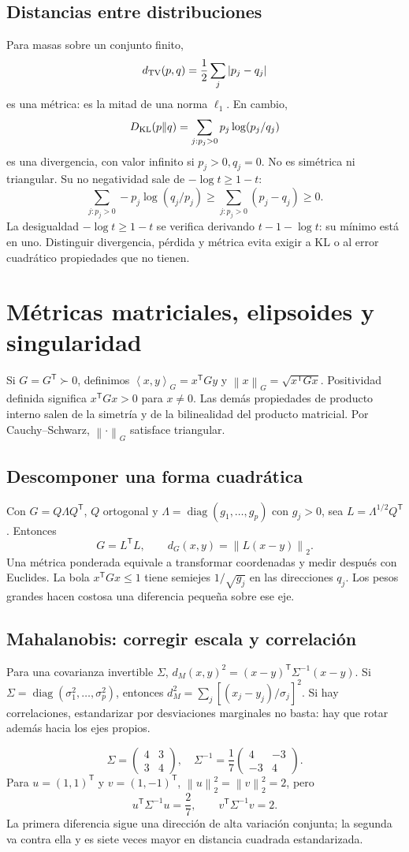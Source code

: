 \documentclass[11pt,a4paper]{article}
\newcommand{\T}{^{\mathsf T}}
\newcommand{\norm}[1]{\left\lVert #1\right\rVert}
\newcommand{\ip}[2]{\left\langle #1,#2\right\rangle}
\DeclareMathOperator{\diag}{diag}
\theoremstyle{definition}
\begin{document}
\subsection{Distancias entre distribuciones}
Para masas sobre un conjunto finito,
\[
d_{\rm TV}(p,q)=\frac12\sum_j|p_j-q_j|
\]
es una métrica: es la mitad de una norma $\ell_1$. En cambio,
\[
D_{\rm KL}(p\Vert q)=\sum_{j:p_j>0}p_j\log(p_j/q_j)
\]
es una divergencia, con valor infinito si $p_j>0,q_j=0$. No es simétrica ni triangular. Su no negatividad sale de $-\log t\ge1-t$:
\[
\sum_{j:p_j>0}-p_j\log(q_j/p_j)\ge
\sum_{j:p_j>0}(p_j-q_j)\ge0.
\]
La desigualdad $-\log t\ge1-t$ se verifica derivando $t-1-\log t$: su mínimo está en uno. Distinguir divergencia, pérdida y métrica evita exigir a KL o al error cuadrático propiedades que no tienen.

\section{Métricas matriciales, elipsoides y singularidad}
Si $G=G\T\succ0$, definimos $\ip xy_G=x\T Gy$ y $\norm x_G=\sqrt{x\T Gx}$. Positividad definida significa $x\T Gx>0$ para $x\ne0$. Las demás propiedades de producto interno salen de la simetría y de la bilinealidad del producto matricial. Por Cauchy--Schwarz, $\norm\cdot_G$ satisface triangular.
\subsection{Descomponer una forma cuadrática}
Con $G=Q\Lambda Q\T$, $Q$ ortogonal y $\Lambda=\diag(g_1,\ldots,g_p)$ con $g_j>0$, sea $L=\Lambda^{1/2}Q\T$. Entonces
\[
G=L\T L,\qquad d_G(x,y)=\norm{L(x-y)}_2.
\]
Una métrica ponderada equivale a transformar coordenadas y medir después con Euclides. La bola $x\T Gx\le1$ tiene semiejes $1/\sqrt{g_j}$ en las direcciones $q_j$. Los pesos grandes hacen costosa una diferencia pequeña sobre ese eje.
\subsection{Mahalanobis: corregir escala y correlación}
Para una covarianza invertible $\Sigma$, $d_M(x,y)^2=(x-y)\T\Sigma^{-1}(x-y)$. Si $\Sigma=\diag(\sigma_1^2,\ldots,\sigma_p^2)$, entonces $d_M^2=\sum_j[(x_j-y_j)/\sigma_j]^2$. Si hay correlaciones, estandarizar por desviaciones marginales no basta: hay que rotar además hacia los ejes propios.
\begin{ejemplo}
\[
\Sigma=\begin{pmatrix}4&3\\3&4\end{pmatrix},\quad
\Sigma^{-1}=\frac17\begin{pmatrix}4&-3\\-3&4\end{pmatrix}.
\]
Para $u=(1,1)\T$ y $v=(1,-1)\T$, $\norm u_2^2=\norm v_2^2=2$, pero
\[
u\T\Sigma^{-1}u=\frac27,\qquad v\T\Sigma^{-1}v=2.
\]
La primera diferencia sigue una dirección de alta variación conjunta; la segunda va contra ella y es siete veces mayor en distancia cuadrada estandarizada.
\end{ejemplo}
\end{document}
